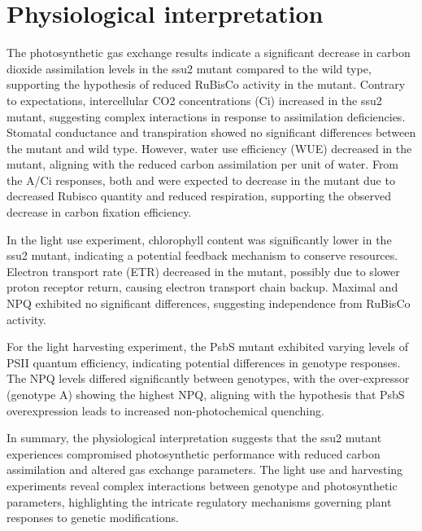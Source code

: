 \documentclass[
]{article}
\begin{document}
\section{Physiological
interpretation}\label{physiological-interpretation}

The photosynthetic gas exchange results indicate a significant decrease
in carbon dioxide assimilation levels in the ssu2 mutant compared to the
wild type, supporting the hypothesis of reduced RuBisCo activity in the
mutant. Contrary to expectations, intercellular CO2 concentrations (Ci)
increased in the ssu2 mutant, suggesting complex interactions in
response to assimilation deficiencies. Stomatal conductance and
transpiration showed no significant differences between the mutant and
wild type. However, water use efficiency (WUE) decreased in the mutant,
aligning with the reduced carbon assimilation per unit of water. From
the A/Ci responses, both {} and {} were expected to decrease in the
mutant due to decreased Rubisco quantity and reduced respiration,
supporting the observed decrease in carbon fixation efficiency.

In the light use experiment, chlorophyll content was significantly lower
in the ssu2 mutant, indicating a potential feedback mechanism to
conserve resources. Electron transport rate (ETR) decreased in the
mutant, possibly due to slower proton receptor return, causing electron
transport chain backup. Maximal {} and NPQ exhibited no significant
differences, suggesting independence from RuBisCo activity.

For the light harvesting experiment, the PsbS mutant exhibited varying
levels of PSII quantum efficiency, indicating potential differences in
genotype responses. The NPQ levels differed significantly between
genotypes, with the over-expressor (genotype A) showing the highest NPQ,
aligning with the hypothesis that PsbS overexpression leads to increased
non-photochemical quenching.

In summary, the physiological interpretation suggests that the ssu2
mutant experiences compromised photosynthetic performance with reduced
carbon assimilation and altered gas exchange parameters. The light use
and harvesting experiments reveal complex interactions between genotype
and photosynthetic parameters, highlighting the intricate regulatory
mechanisms governing plant responses to genetic modifications.
\end{document}
